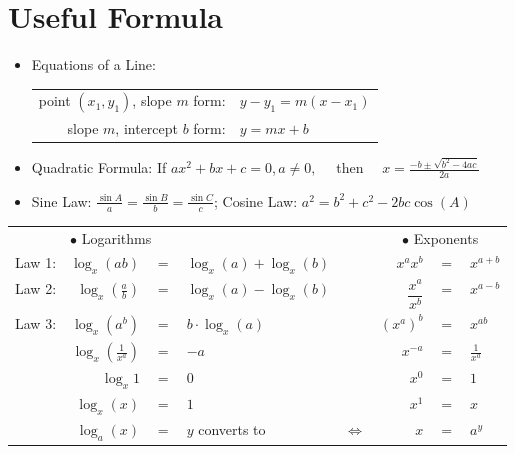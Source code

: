 {}
\chapter*{Useful Formula}
\begin{itemize}
	\item Equations of a Line:
\begin{center}\begin{tabular}{rl}
		point $(x_1,y_1)$, slope $m$ form:&$y-y_1 = m(x - x_1)$\\
		slope $m$, intercept $b$ form:&$y=mx+b$
	\end{tabular}\end{center}
	\item Quadratic Formula:
	If $ax^2+bx+c=0$,\,$a\ne0,\quad$ then $\displaystyle\quad x = \frac{-b\pm \sqrt{b^2-4ac}}{2a}$
	\item Sine Law: $\frac{\sin A}{a}= \frac{\sin B}{b}=\frac{\sin C}{c}$; \hspace{0.2cm}Cosine Law: $a^2=b^2+c^2-2bc\cos(A)$
\end{itemize}
{\hspace*{0.55cm}
		\renewcommand{\arraystretch}{1.2}
		\begin{tabular}{lrclcrcl}
			&\multicolumn{3}{l}{\phantom{aaaa}$\bullet$ Logarithms}& &\multicolumn{3}{c}{$\bullet$ Exponents}\\
			\cmidrule{1-4}\cmidrule{6-8}
			Law 1: &$ \log_x(ab) $&$=$&$ \log_x(a)+\log_x(b)  $&\hspace{1cm} &$x^a x^b$&$=$&$x^{a+b} $\\
			Law 2: &$ \log_x\left(\frac{a}{b}\right) $&$=$&$  \log_x(a)-\log_x(b) $& &$\dfrac{x^a}{x^b}$&$=$&$x^{a-b}  $\\
			Law 3: &$ \log_x(a^b) $&$=$&$ b\cdot\log_x(a)   $& &$(x^a)^b $&$=$&$x^{ab} $\\
			\cmidrule{1-4}\cmidrule{6-8}
			&$  \log_{x}\left(\frac{1}{x^a}\right) $&$=$&$-a   $& &$x^{-a} $&$=$&$\frac{1}{x^a} $\\
			&$ \log_{x}1  $&$=$&$ 0  $& &$x^0 $&$=$&$1 $\\
			&$ \log_x(x) $&$=$&$  1 $& &$x^1 $&$=$&$x $\\
			\bottomrule
			&$ \log_a(x) $&$=$&$y$\hspace{0.5cm} converts to& $\Leftrightarrow$ &$x $&$=$&$a^y $\\
			\bottomrule
		\end{tabular}\\
}
